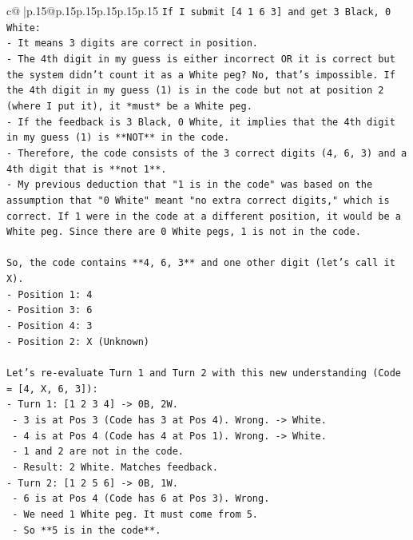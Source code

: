 \documentclass{article}
\begin{document}
{\begin{supertabular}{c@{$\;$}|p{.15\linewidth}@{}p{.15\linewidth}p{.15\linewidth}p{.15\linewidth}p{.15\linewidth}p{.15\linewidth}}
{{{\texttt{If I submit {[}4 1 6 3{]} and get 3 Black, 0 White:} \\
\texttt{{-} It means 3 digits are correct in position.} \\
\texttt{{-} The 4th digit in my guess is either incorrect OR it is correct but the system didn't count it as a White peg? No, that's impossible. If the 4th digit in my guess (1) is in the code but not at position 2 (where I put it), it *must* be a White peg.} \\
\texttt{{-} If the feedback is 3 Black, 0 White, it implies that the 4th digit in my guess (1) is **NOT** in the code.} \\
\texttt{{-} Therefore, the code consists of the 3 correct digits (4, 6, 3) and a 4th digit that is **not 1**.} \\
\texttt{{-} My previous deduction that "1 is in the code" was based on the assumption that "0 White" meant "no extra correct digits," which is correct. If 1 were in the code at a different position, it would be a White peg. Since there are 0 White pegs, 1 is not in the code.} \\
\\ 
\texttt{So, the code contains **4, 6, 3** and one other digit (let's call it X).} \\
\texttt{{-} Position 1: 4} \\
\texttt{{-} Position 3: 6} \\
\texttt{{-} Position 4: 3} \\
\texttt{{-} Position 2: X (Unknown)} \\
\\ 
\texttt{Let's re{-}evaluate Turn 1 and Turn 2 with this new understanding (Code = {[}4, X, 6, 3{]}):} \\
\texttt{{-} Turn 1: {[}1 2 3 4{]} {-}> 0B, 2W.} \\
\texttt{  {-} 3 is at Pos 3 (Code has 3 at Pos 4). Wrong. {-}> White.} \\
\texttt{  {-} 4 is at Pos 4 (Code has 4 at Pos 1). Wrong. {-}> White.} \\
\texttt{  {-} 1 and 2 are not in the code.} \\
\texttt{  {-} Result: 2 White. Matches feedback.} \\
\texttt{{-} Turn 2: {[}1 2 5 6{]} {-}> 0B, 1W.} \\
\texttt{  {-} 6 is at Pos 4 (Code has 6 at Pos 3). Wrong.} \\
\texttt{  {-} We need 1 White peg. It must come from 5.} \\
\texttt{  {-} So **5 is in the code**.} \\
}}}
\end{supertabular}}
\end{document}
